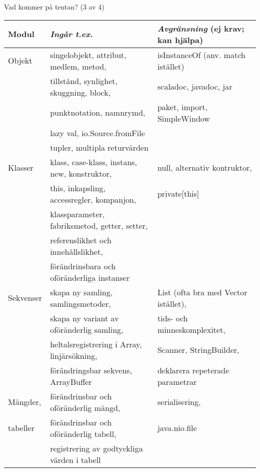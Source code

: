 \begin{Slide}{Vad kommer på tentan? (3 av 4)}\SlideFontTiny
\hspace{-2em}\begin{minipage}{1.0\textwidth}
\begin{tabular}{l | l | l}
\textbf{Modul} & \textit{Ingår t.ex.}& \textit{Avgränsning} (ej krav; kan hjälpa)\\\hline
Objekt      & singelobjekt, attribut, medlem, metod, & isInstanceOf (anv. match istället) \\
            & tillstånd, synlighet, skuggning, block, & scaladoc, javadoc, jar \\
            & punktnotation, namnrymd,  & paket, import, SimpleWindow \\
            & lazy val, io.Source.fromFile  &  \\
            & tupler, multipla returvärden &  \\
\hline

Klasser     &  klass, case-klass, instans, new, konstruktor, & null, alternativ kontruktor, \\
            &  this, inkapsling, accessregler, kompanjon, & private[this] \\
            &  klassparameter, fabriksmetod, getter, setter, & \\
            &  referenslikhet och innehållslikhet,    & \\
            &  förändrinsbara och oföränderliga instanser & \\
\hline

Sekvenser  &  skapa ny samling, samlingsmetoder, &   List (ofta bra med Vector istället), \\
            & skapa ny variant av oföränderlig samling, & tids- och minneskomplexitet, \\
            &  heltalsregistrering i Array, linjärsökning, & Scanner, StringBuilder,\\
            &  förändringsbar sekvens, ArrayBuffer & deklarera repeterade parametrar\\
\hline

Mängder, & förändrinsbar och oföränderlig mängd,  & serialisering, \\
tabeller & förändrinsbar och oföränderlig tabell, & java.nio.file\\
         & registrering av godtyckliga värden i tabell  & \\
\hline

\end{tabular}
\end{minipage}
\end{Slide}


